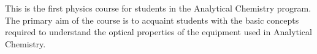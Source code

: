 {This is the first physics course for students in the Analytical Chemistry program. The primary aim of the course is to acquaint students with the basic concepts required to understand the optical properties of the equipment used in Analytical Chemistry.}
